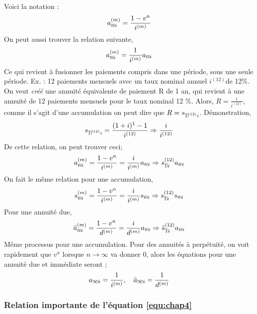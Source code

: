 \documentclass[11pt,french]{report}
\makeatletter
\DeclareRobustCommand{\annuity}[1]{%
\def\arraystretch{0}%
\setlength\arraycolsep{.7pt}%
\setlength\arrayrulewidth{.3pt}%
\begin{array}[b]{@{}c|}\hline
\\[\arraycolsep]%
\scriptstyle #1%
\end{array}%
}
\makeatother
\begin{document}
Voici la notation : 
\begin{equation}
a_{\annuity{n}i}^{(m)} = \frac{1-v^n}{i^{(m)}}
\end{equation}
On peut aussi trouver la relation suivante,
\begin{equation}
a_{\annuity{n}i}^{(m)} = \frac{1}{i^{(m)}}a_{\annuity{n}i}
\end{equation}
Ce qui revient à fusionner les paiements compris dans une période, sous une seule période. Ex. : 12 paiements mensuels avec un taux nominal annuel $\textit{i}^{(12)} $de 12\%. On veut \emph{créé} une annuité équivalente de paiement R de 1 an, qui revient à une annuité de 12 paiements mensuels pour le taux nominal 12 \%. Alors, $ R = \frac{i}{i^{(12)}}$, comme il s'agit d'une accumulation on peut dire que $ R = s_{\annuity{1}^{(12)}i}$.
Démonstration, 
\begin{equation}
s_{\annuity{1}^{(12)}i} = \frac{(1+i)^1 - 1}{i^{(12)}} \Rightarrow \frac{i}{i^{(12)}}
\end{equation}
De cette relation, on peut trouver ceci;
\begin{equation}
a_{\annuity{n}i}^{(m)} = \frac{1 - v^{n}}{i^{(m)}} = \frac{i}{i^{(m)}} a_{\annuity{n}i} \Rightarrow s_{\annuity{1}i}^{(12)} a_{\annuity{n}i}
\end{equation}
On fait le même relation pour une accumulation,
\begin{equation}
s_{\annuity{n}i}^{(m)} = \frac{1 - v^{n}}{i^{(m)}} = \frac{i}{i^{(m)}} s_{\annuity{n}i} \Rightarrow s_{\annuity{1}i}^{(12)} s_{\annuity{n}i}
\end{equation}
Pour une annuité due,
\begin{equation}
\ddot{a}_{\annuity{n}i}^{(m)} = \frac{1 - v^{n}}{d^{(m)}} = \frac{i}{d^{(m)}} a_{\annuity{n}i} \Rightarrow \ddot{s}_{\annuity{1}i}^{(12)} a_{\annuity{n}i}
\end{equation}
Même processus pour une accumulation.
Pour des annuités à perpétuité, on voit rapidement que $v^n$ lorsque $n\longrightarrow \infty$ va donner 0, alors les équations pour une annuité due et immédiate seront ;
\begin{equation}
\label{equ:chap4}
a_{\annuity{\infty}i} = \frac{1}{i^{(m)}}, \quad \ddot{a}_{\annuity{\infty}i} = \frac{1}{d^{(m)}}
\end{equation}

\subsubsection{Relation importante de l'équation \ref{equ:chap4} }
\label{sub:sub:relation imporante}
\end{document}
